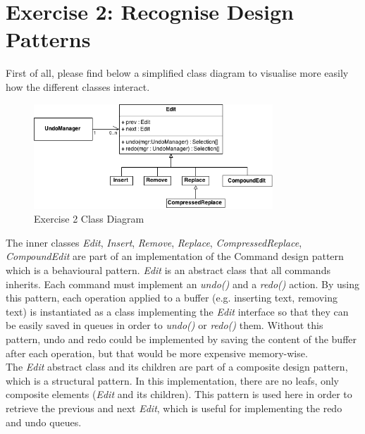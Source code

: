 \section{Exercise 2: Recognise Design Patterns}

First of all, please find below a simplified class diagram to visualise
more easily how the different classes interact.\\

\begin{figure}[h!]
    \includegraphics[width=0.8\textwidth]{images/ex2.png}
    \centering
    \caption{Exercise 2 Class Diagram}
\end{figure}

The inner classes \emph{Edit}, \emph{Insert}, \emph{Remove}, \emph{Replace},
\emph{CompressedReplace}, \emph{CompoundEdit} are part of an implementation of
the Command design pattern which is a behavioural pattern. \emph{Edit} is an
abstract class that all commands inherits. Each command must implement an
\emph{undo()} and a \emph{redo()} action. By using this pattern, each operation
applied to a buffer (e.g. inserting text, removing text) is instantiated
as a class implementing the \emph{Edit} interface so that they can be
easily saved in queues in order to \emph{undo()} or \emph{redo()} them.
Without this pattern, undo and redo could be implemented by saving the
content of the buffer after each operation, but that would be more
expensive memory-wise.\\

The \emph{Edit} abstract class and its children are part of a composite
design pattern, which is a structural pattern. In this implementation,
there are no leafs, only composite elements (\emph{Edit} and its
children). This pattern is used here in order to retrieve the previous
and next \emph{Edit}, which is useful for implementing the redo and undo
queues.
\newpage

